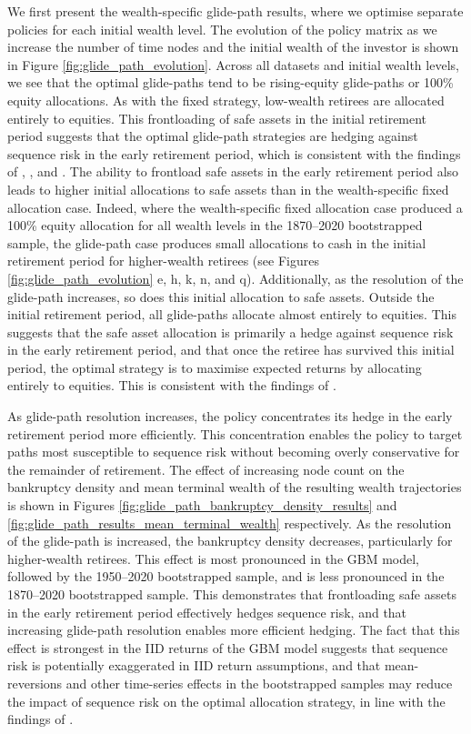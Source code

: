 \documentclass[11pt]{article}
\begin{document}
We first present the wealth-specific glide-path results, where we optimise separate policies for each initial wealth level. The evolution of the policy matrix as we increase the number of time nodes and the initial wealth of the investor is shown in Figure \ref{fig:glide_path_evolution}. Across all datasets and initial wealth levels, we see that the optimal glide-paths tend to be rising-equity glide-paths or 100\% equity allocations. As with the fixed strategy, low-wealth retirees are allocated entirely to equities. This frontloading of safe assets in the initial retirement period suggests that the optimal glide-path strategies are hedging against sequence risk in the early retirement period, which is consistent with the findings of \textcite{anarkulova2025beyond}, \textcite{pfau2014rising}, and \textcite{estrada2014glidepath}. The ability to frontload safe assets in the early retirement period also leads to higher initial allocations to safe assets than in the wealth-specific fixed allocation case. Indeed, where the wealth-specific fixed allocation case produced a 100\% equity allocation for all wealth levels in the 1870--2020 bootstrapped sample, the glide-path case produces small allocations to cash in the initial retirement period for higher-wealth retirees (see Figures \ref{fig:glide_path_evolution} e, h, k, n, and q). Additionally, as the resolution of the glide-path increases, so does this initial allocation to safe assets. Outside the initial retirement period, all glide-paths allocate almost entirely to equities. This suggests that the safe asset allocation is primarily a hedge against sequence risk in the early retirement period, and that once the retiree has survived this initial period, the optimal strategy is to maximise expected returns by allocating entirely to equities. This is consistent with the findings of \textcite{anarkulova2025beyond}. 

As glide-path resolution increases, the policy concentrates its hedge in the early retirement period more efficiently. This concentration enables the policy to target paths most susceptible to sequence risk without becoming overly conservative for the remainder of retirement. The effect of increasing node count on the bankruptcy density and mean terminal wealth of the resulting wealth trajectories is shown in Figures \ref{fig:glide_path_bankruptcy_density_results} and \ref{fig:glide_path_results_mean_terminal_wealth} respectively. As the resolution of the glide-path is increased, the bankruptcy density decreases, particularly for higher-wealth retirees. This effect is most pronounced in the GBM model, followed by the 1950--2020 bootstrapped sample, and is less pronounced in the 1870--2020 bootstrapped sample. This demonstrates that frontloading safe assets in the early retirement period effectively hedges sequence risk, and that increasing glide-path resolution enables more efficient hedging. The fact that this effect is strongest in the IID returns of the GBM model suggests that sequence risk is potentially exaggerated in IID return assumptions, and that mean-reversions and other time-series effects in the bootstrapped samples may reduce the impact of sequence risk on the optimal allocation strategy, in line with the findings of \textcite{anarkulova2025beyond}.
\end{document}

